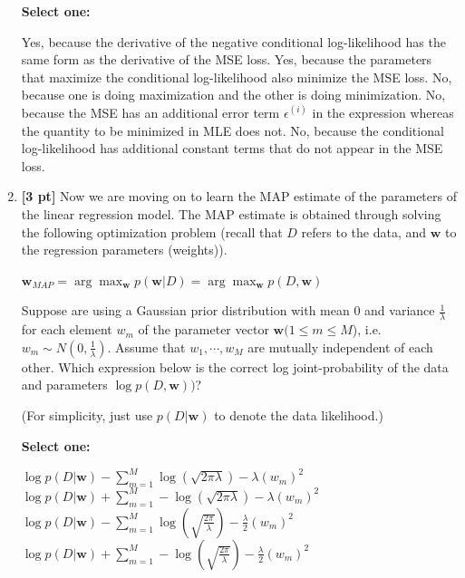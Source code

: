 \documentclass[11pt,addpoints,answers]{exam}
\begin{document}
\begin{enumerate}
    \textbf{Select one:}
    \begin{checkboxes}
        \choice Yes, because the derivative of the negative conditional log-likelihood has the same form as the derivative of the MSE loss. 
        \choice Yes, because the parameters that maximize the conditional log-likelihood also minimize the MSE loss.
        \choice No, because one is doing maximization and the other is doing minimization.
        \choice No, because the MSE has an additional error term $\epsilon^{(i)}$ in the expression whereas the quantity to be minimized in MLE does not. 
        \choice No, because the conditional log-likelihood has additional constant terms that do not appear in the MSE loss.
    \end{checkboxes}
    
    \item \textbf{[3 pt]} Now we are moving on to learn the MAP estimate of the parameters of the linear regression model. The MAP estimate is obtained through solving the following optimization problem (recall that $D$ refers to the data, and $\mathbf{w}$ to the regression parameters (weights)).

    $\mathbf{w}_{MAP} = \arg\max_{\mathbf{w}} p(\mathbf{w} | D) = \arg\max_{\mathbf{w}} p(D, \mathbf{w})$

    Suppose are using a Gaussian prior distribution with mean 0 and variance $\frac{1}{\lambda}$ for each element $w_m$  of the parameter vector $\mathbf{w} (1 \leq m \leq M $), i.e. $w_m \sim N(0, \frac{1}{\lambda})$. Assume that $w_1, \cdots, w_M$ are mutually independent of each other. Which expression below is the correct log joint-probability of the data and parameters $\log p(D, \mathbf{w}))$? 

    (For simplicity, just use $p(D|\mathbf{w})$ to denote the data likelihood.)

    \textbf{Select one:}
    \begin{checkboxes}
        \choice $\log p(D|\textbf{w}) - \sum_{m=1}^M \log(\sqrt{2\pi\lambda}) - \lambda (w_m)^2$
        \choice $\log p(D|\textbf{w}) + \sum_{m=1}^M -\log(\sqrt{2\pi\lambda}) - \lambda (w_m)^2$
        \choice $\log p(D|\textbf{w}) -  \sum_{m=1}^M \log(\sqrt{\frac{2\pi}{\lambda}}) - \frac{\lambda}{2}(w_m)^2$
        \choice $\log p(D|\textbf{w}) +  \sum_{m=1}^M -\log(\sqrt{\frac{2\pi}{\lambda}}) - \frac{\lambda}{2}(w_m)^2$
    \end{checkboxes}
    
    
    \clearpage
    

\end{enumerate}
\end{document}
